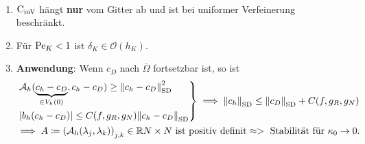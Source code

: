 \begin{remark}\
	\begin{enumerate}[label=\Alph*)]
		\item $ \operatorname{C_{\text{inV}}} $ hängt \textbf{nur} vom Gitter ab und ist bei uniformer Verfeinerung beschränkt.
		\item Für $ \operatorname{Pe}_K < 1 $ ist $ \delta_K \in \mathcal{O}(h_K) $.
		\item \textbf{Anwendung}: Wenn $ c_D $ nach $ \overline{\Omega} $ fortsetzbar ist, so ist
		\begin{gather*}
			\begin{rcases}
				\mathcal{A}_h(\underbrace{c_h-c_D}_{\in V_h(0)}, c_h - c_D ) \geq \norm{c_h - c_D}_{\operatorname{\text{SD}}}^2 \\
				\abs{b_h(c_h-c_D)} \leq C(f,g_R, g_N) \norm{c_h - c_D}_{\operatorname{\text{SD}}}
			\end{rcases} \implies \norm{c_h}_{\operatorname{\text{SD}}} \leq \norm{c_D}_{\operatorname{\text{SD}}} + C(f,g_R,g_N)\\
			\implies A \coloneqq \left( \mathcal{A}_h(\lambda_j, \lambda_k) \right)_{j,k} \in \mathbb{R}{N \times N} \text{ ist positiv definit} \approx> \text{ Stabilität für } \kappa_0 \to 0.
		\end{gather*}
	\end{enumerate}
\end{remark}
